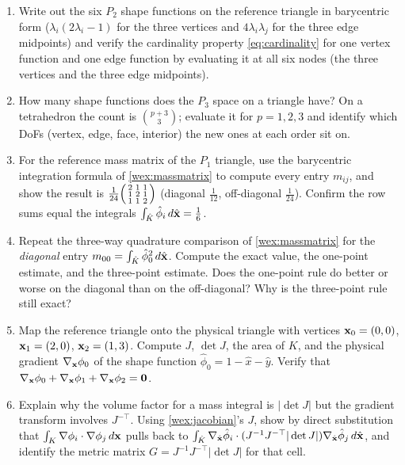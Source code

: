 \exercisessection
\begin{enumerate}[nosep]
\item Write out the six $P_2$ shape functions on the reference triangle in
  barycentric form ($\lambda_i(2\lambda_i-1)$ for the three vertices and
  $4\lambda_i\lambda_j$ for the three edge midpoints) and verify the cardinality
  property \eqref{eq:cardinality} for one vertex function and one edge function by
  evaluating it at all six nodes (the three vertices and the three edge midpoints).
\item How many shape functions does the $P_3$ space on a triangle have? On a
  tetrahedron the count is $\binom{p+3}{3}$; evaluate it for $p=1,2,3$ and identify
  which DoFs (vertex, edge, face, interior) the new ones at each order sit on.
\item For the reference mass matrix of the $P_1$ triangle, use the barycentric
  integration formula of \cref{wex:massmatrix} to compute every entry $m_{ij}$, and
  show the result is $\tfrac{1}{24}\begin{psmallmatrix}2&1&1\\1&2&1\\1&1&2\end{psmallmatrix}$
  (diagonal $\tfrac{1}{12}$, off-diagonal $\tfrac{1}{24}$). Confirm the row sums equal
  the integrals $\int_{\hat K}\hat\phi_i\,d\hat{\mathbf{x}}=\tfrac16$.
\item Repeat the three-way quadrature comparison of \cref{wex:massmatrix} for the
  \emph{diagonal} entry $m_{00}=\int_{\hat K}\hat\phi_0^2\,d\hat{\mathbf{x}}$. Compute the exact
  value, the one-point estimate, and the three-point estimate. Does the one-point rule
  do better or worse on the diagonal than on the off-diagonal? Why is the three-point
  rule still exact?
\item Map the reference triangle onto the physical triangle with vertices
  $\mathbf{x}_0=(0,0)$, $\mathbf{x}_1=(2,0)$, $\mathbf{x}_2=(1,3)$. Compute $J$, $\det J$, the area of $K$,
  and the physical gradient $\nabla_{\mathbf{x}}\phi_0$ of the shape function
  $\hat\phi_0=1-\hat x-\hat y$. Verify that $\nabla_{\mathbf{x}}\phi_0+\nabla_{\mathbf{x}}\phi_1+\nabla_{\mathbf{x}}\phi_2=\mathbf 0$.
\item Explain why the volume factor for a mass integral is $|\det J|$ but the gradient
  transform involves $J^{-\top}$. Using \cref{wex:jacobian}'s $J$, show by direct
  substitution that $\int_K\nabla\phi_i\cdot\nabla\phi_j\,d\mathbf{x}$ pulls back to
  $\int_{\hat K}\nabla_{\hat{\mathbf{x}}}\hat\phi_i\cdot(J^{-1}J^{-\top}|\det J|)\nabla_{\hat{\mathbf{x}}}\hat\phi_j\,d\hat{\mathbf{x}}$,
  and identify the metric matrix $G=J^{-1}J^{-\top}|\det J|$ for that cell.

\end{enumerate}
